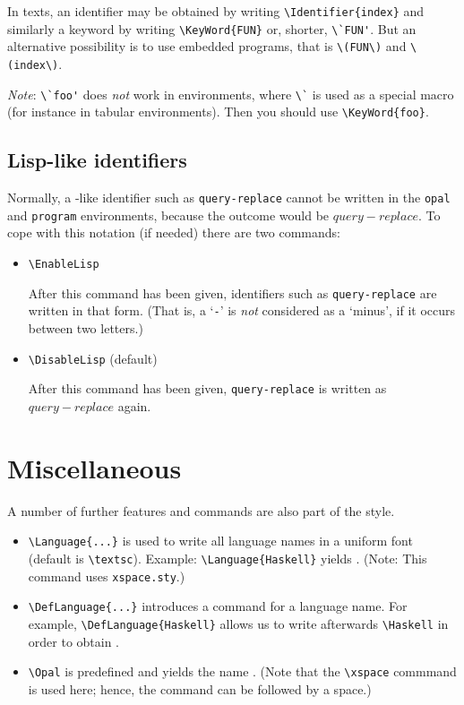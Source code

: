 In texts, an identifier  may be obtained by writing
\verb+\Identifier{index}+ and similarly a keyword  by writing
\verb+\KeyWord{FUN}+ or, shorter, \verb+\`FUN'+. But an alternative
possibility is to use embedded programs, that is \verb+\(FUN\)+ and
\verb+\(index\)+.

\emph{Note}: \verb+\`foo'+ does \emph{not} work in environments, where
\verb+\`+ is used as a special macro (for instance in tabular
environments). Then you should use \verb+\KeyWord{foo}+.



\subsection{Lisp-like identifiers}

Normally, a -like identifier such as \verb+query-replace+
cannot be written in the \texttt{opal} and \texttt{program} environments,
because the outcome would be \(query-replace\). To cope with this notation
(if needed) there are two commands:

\begin{itemize}
  \item \verb+\EnableLisp+
    
    After this command has been given, identifiers such as
    \verb+query-replace+ are written in that form. (That is, a `\verb+-+' is
    \emph{not} considered as a `minus', if it occurs between two letters.)

  \item \verb+\DisableLisp+ (default)
    
    After this command has been given, \verb+query-replace+ is written as
    \(query-replace\) again.
\end{itemize}




\section{Miscellaneous}

A number of further features and commands are also part of the style.


\begin{itemize}
  \item \verb+\Language{...}+ is used to write all language names in a
    uniform font (default is \verb+\textsc+). Example:
    \verb+\Language{Haskell}+ yields . (Note: This command
    uses \texttt{xspace.sty}.)
    
  \item \verb+\DefLanguage{...}+ introduces a command for a language
    name. For example, \verb+\DefLanguage{Haskell}+ allows us to write
    afterwards \verb+\Haskell+ in order to obtain \Haskell.
    
  \item \verb+\Opal+ is predefined and yields the name \Opal. (Note that
    the \verb+\xspace+ commmand is used here; hence, the command can be
    followed by a space.)
\end{itemize}






